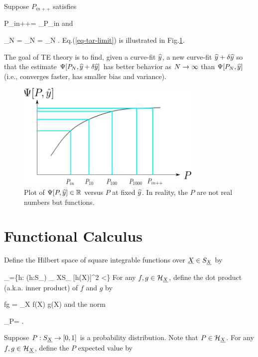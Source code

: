 Suppose $P_{in++}$ satisfies


\beq
P_{in++}= \argmin_{P_{in}}\call[P_{in}, \haty]
\eeq
and

\beq
\lim_{N\rarrow \infty}
=
\lim_{N\rarrow \infty}
=
\lim_{N\rarrow \infty}
\Psi[P_N, \haty]
\label{eq-tar-limit}
\;.
\eeq
Eq.(\ref{eq-tar-limit}) is illustrated in
Fig.\ref{fig-targeted-p-psi-plot.png}.

The goal of TE theory
is to find, given a curve-fit ${\widehat{y}}$,
a new curve-fit ${\widehat{y}} +\delta {\widehat{y}}$
so that the
estimate $\Psi[P_N, {\widehat{y}}+\delta {\widehat{y}}]$
has better behavior as $N\rightarrow \infty$ than
$\Psi[P_N, {\widehat{y}}]$ (i.e., converges faster,
has smaller bias and variance).


\begin{figure}[h!]
\centering
\includegraphics[width=3.5in]
{targeted-est/targeted-p-psi-plot.png}
\caption{
Plot of $\Psi[P, {\widehat{y}}]\in { \mathbb{R}}$ versus $P$
at fixed ${\widehat{y}}$.
In reality, the $P$ are not real numbers but
functions.
}
\label{fig-targeted-p-psi-plot.png}
\end{figure}


\section{Functional Calculus}

Define
the Hilbert space of square integrable functions over ${\underline{X}}\in S_{\underline{X}}$
by

\beq
\calh_\rvX =\{h: (h:S_\rvX\rarrow \RR) 
\sum_{ X\in S_ \rvX}[h(X)]^2 <\infty\}
\eeq
For any $f,g\in {\cal H}_{\underline{X}}$,
define the dot product (a.k.a. inner product)
of $f$ and $g$ by

\beq
f\cdot g = \sum_X f(X) g(X)
\eeq
and the norm

\beq
{}_P= 
\;.
\eeq

Suppose $P:S_{\underline{X}}\rightarrow [0,1]$
is a probability distribution.
Note that $P\in{\cal H}_{\underline{X}}$.
For any $f,g\in{\cal H}_{\underline{X}}$,
define the $P$ expected value by

